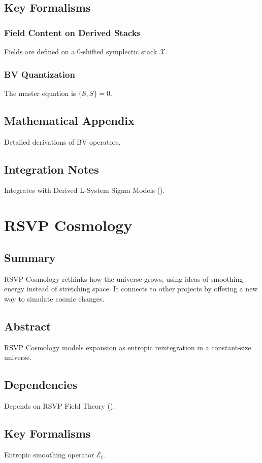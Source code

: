 \documentclass[11pt,oneside]{memoir}
\theoremstyle{plain}
\newcommand{\X}{\mathcal{X}}
\newcommand{\E}{\mathcal{E}}
\begin{document}
\section{Key Formalisms}
\subsection{Field Content on Derived Stacks}
Fields are defined on a 0-shifted symplectic stack \(\X\).

\subsection{BV Quantization}
The master equation is \(\{S, S\} = 0\).

\section{Mathematical Appendix}
Detailed derivations of BV operators.

\section{Integration Notes}
Integrates with Derived L-System Sigma Models ().

\chapter{RSVP Cosmology}
\label{sec:rsvp_cosmology}
\section{Summary}
RSVP Cosmology rethinks how the universe grows, using ideas of smoothing energy instead of stretching space. It connects to other projects by offering a new way to simulate cosmic changes.

\section{Abstract}
RSVP Cosmology models expansion as entropic reintegration in a constant-size universe.

\section{Dependencies}
Depends on RSVP Field Theory ().

\section{Key Formalisms}
Entropic smoothing operator \(\E_t\).
\end{document}
